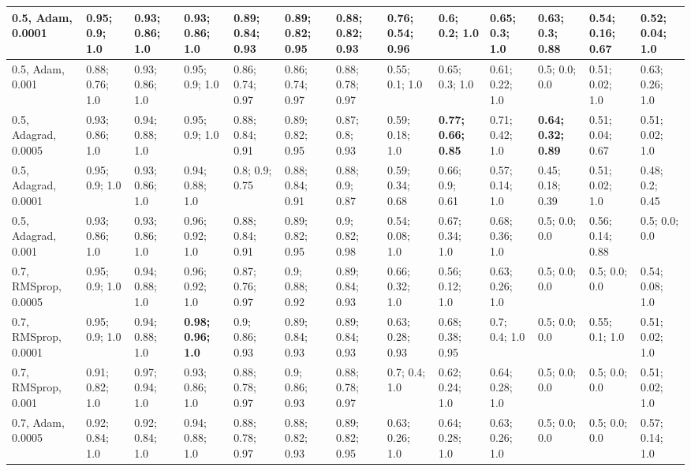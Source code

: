 \documentclass{VUMIFPSbakalaurinis}
\begin{document}
\begin{longtable}{ | p{1.5cm} | p{1cm} | p{1cm} | p{1cm} | p{1cm} | p{1cm} | p{1cm} | p{1cm} | p{1cm} | p{1cm} | p{1cm} | p{1cm} | p{1cm} | }
    0.5, Adam, 0.0001     & 0.95; 0.9; 1.0 & 0.93; 0.86; 1.0 & 0.93; 0.86; 1.0    &  0.89; 0.84; 0.93 & 0.89; 0.82; 0.95 & 0.88; 0.82; 0.93  &  \textbf{0.76; 0.54; 0.96} & 0.6; 0.2; 1.0 & 0.65; 0.3; 1.0      &  0.63; 0.3; 0.88 & 0.54; 0.16; 0.67 & 0.52; 0.04; 1.0  \\ \hline
    0.5, Adam, 0.001      & 0.88; 0.76; 1.0 & 0.93; 0.86; 1.0 & 0.95; 0.9; 1.0    &  0.86; 0.74; 0.97 & 0.86; 0.74; 0.97 & 0.88; 0.78; 0.97  &  0.55; 0.1; 1.0 & 0.65; 0.3; 1.0 & 0.61; 0.22; 1.0               &  0.5; 0.0; 0.0 & 0.51; 0.02; 1.0 & 0.63; 0.26; 1.0  \\ \hline
    0.5, Adagrad, 0.0005  & 0.93; 0.86; 1.0 & 0.94; 0.88; 1.0 & 0.95; 0.9; 1.0    &  0.88; 0.84; 0.91 & 0.89; 0.82; 0.95 & 0.87; 0.8; 0.93   &  0.59; 0.18; 1.0 & \textbf{0.77; 0.66; 0.85} & 0.71; 0.42; 1.0   &  \textbf{0.64; 0.32; 0.89} & 0.51; 0.04; 0.67 & 0.51; 0.02; 1.0  \\ \hline
    0.5, Adagrad, 0.0001  & 0.95; 0.9; 1.0 & 0.93; 0.86; 1.0 & 0.94; 0.88; 1.0    &  0.8; 0.9; 0.75 & 0.88; 0.84; 0.91 & 0.88; 0.9; 0.87     &  0.59; 0.34; 0.68 & 0.66; 0.9; 0.61 & 0.57; 0.14; 1.0            &  0.45; 0.18; 0.39 & 0.51; 0.02; 1.0 & 0.48; 0.2; 0.45  \\ \hline
    0.5, Adagrad, 0.001   & 0.93; 0.86; 1.0 & 0.93; 0.86; 1.0 & 0.96; 0.92; 1.0   &  0.88; 0.84; 0.91 & 0.89; 0.82; 0.95 & 0.9; 0.82; 0.98   &  0.54; 0.08; 1.0 & 0.67; 0.34; 1.0 & 0.68; 0.36; 1.0             &  0.5; 0.0; 0.0 & 0.56; 0.14; 0.88 & 0.5; 0.0; 0.0  \\ \hline
    0.7, RMSprop, 0.0005  & 0.95; 0.9; 1.0 & 0.94; 0.88; 1.0 & 0.96; 0.92; 1.0    &  0.87; 0.76; 0.97 & 0.9; 0.88; 0.92 & 0.89; 0.84; 0.93   &  0.66; 0.32; 1.0 & 0.56; 0.12; 1.0 & 0.63; 0.26; 1.0             &  0.5; 0.0; 0.0 & 0.5; 0.0; 0.0 & 0.54; 0.08; 1.0  \\ \hline
    0.7, RMSprop, 0.0001  & 0.95; 0.9; 1.0 & 0.94; 0.88; 1.0 & \textbf{0.98; 0.96; 1.0}    &  0.9; 0.86; 0.93 & 0.89; 0.84; 0.93 & 0.89; 0.84; 0.93   &  0.63; 0.28; 0.93 & 0.68; 0.38; 0.95 & 0.7; 0.4; 1.0             &  0.5; 0.0; 0.0 & 0.55; 0.1; 1.0 & 0.51; 0.02; 1.0  \\ \hline
    0.7, RMSprop, 0.001   & 0.91; 0.82; 1.0 & 0.97; 0.94; 1.0 & 0.93; 0.86; 1.0   &  0.88; 0.78; 0.97 & 0.9; 0.86; 0.93 & 0.88; 0.78; 0.97   &  0.7; 0.4; 1.0 & 0.62; 0.24; 1.0 & 0.64; 0.28; 1.0               &  0.5; 0.0; 0.0 & 0.5; 0.0; 0.0 & 0.51; 0.02; 1.0  \\ \hline
    0.7, Adam, 0.0005     & 0.92; 0.84; 1.0 & 0.92; 0.84; 1.0 & 0.94; 0.88; 1.0   &  0.88; 0.78; 0.97 & 0.88; 0.82; 0.93 & 0.89; 0.82; 0.95  &  0.63; 0.26; 1.0 & 0.64; 0.28; 1.0 & 0.63; 0.26; 1.0             &  0.5; 0.0; 0.0 & 0.5; 0.0; 0.0 & 0.57; 0.14; 1.0  \\ \hline

\end{longtable}
\end{document}
